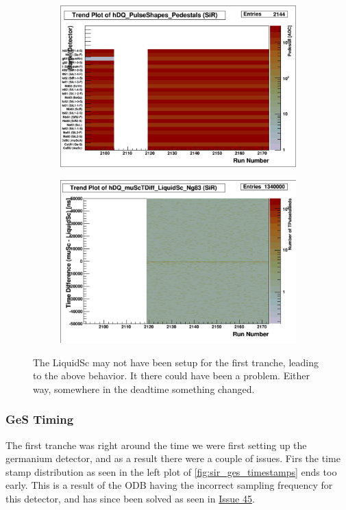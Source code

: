 \documentclass[a4paper]{article}
\newcommand{\issue}[1]{\href{https://github.com/alcap-org/AlcapDAQ/issues/#1}{Issue #1}}
\begin{document}
\begin{figure}
  \centering
  \begin{subfigure}{0.5\textwidth}
    \includegraphics[width=0.9\linewidth]{figs/sir/pedestals}
  \end{subfigure}%
  \begin{subfigure}{0.5\textwidth}
    \includegraphics[width=0.9\linewidth]{figs/sir/lqsc_tdiff}
  \end{subfigure}
  \caption{The LiquidSc may not have been setup for the first tranche, leading to the above
    behavior. It there could have been a problem. Either way, somewhere in the deadtime something
    changed.}
  \label{fig:sir_lqcd_setup}
\end{figure}


\subsubsection{GeS Timing}
The first tranche was right around the time we were first setting up the germanium detector, and as a result there were a couple of issues.
Firs the time stamp distribution as seen in the left plot of \ref{fig:sir_ges_timestamps} ends too early. This is a result of the ODB
having the incorrect sampling frequency for this detector, and has since been solved as seen in \issue{45}.
\end{document}
